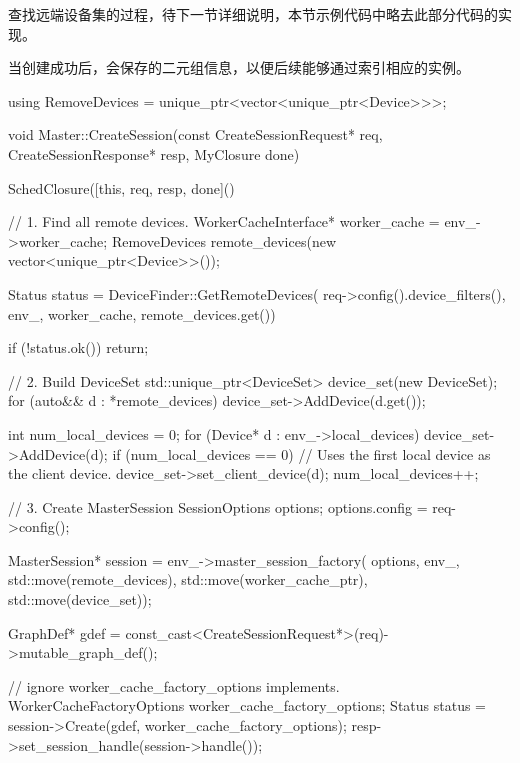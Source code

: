 \begin{content}
\begin{remark}
查找远端设备集的过程，待下一节详细说明，本节示例代码中略去此部分代码的实现。
\end{remark}

当创建成功后，会保存的二元组信息，以便后续能够通过索引相应的实例。

\begin{leftbar}
\begin{c++}
using RemoveDevices = unique_ptr<vector<unique_ptr<Device>>>;

void Master::CreateSession(const CreateSessionRequest* req,
                           CreateSessionResponse* resp, MyClosure done) {
  SchedClosure([this, req, resp, done]() {
    // 1. Find all remote devices. 
    WorkerCacheInterface* worker_cache = env_->worker_cache;
    RemoveDevices remote_devices(new vector<unique_ptr<Device>>());

    Status status = DeviceFinder::GetRemoteDevices(
        req->config().device_filters(), env_,
        worker_cache, remote_devices.get())

    if (!status.ok()) return;

    // 2. Build DeviceSet
    std::unique_ptr<DeviceSet> device_set(new DeviceSet);
    for (auto&& d : *remote_devices) {
      device_set->AddDevice(d.get());
    }

    int num_local_devices = 0;
    for (Device* d : env_->local_devices) {
      device_set->AddDevice(d);
      if (num_local_devices == 0) {
        // Uses the first local device as the client device.
        device_set->set_client_device(d);
      }
      num_local_devices++;
    }

    // 3. Create MasterSession
    SessionOptions options;
    options.config = req->config();
    
    MasterSession* session = env_->master_session_factory(
        options, env_, std::move(remote_devices), 
        std::move(worker_cache_ptr), std::move(device_set));

    GraphDef* gdef =
        const_cast<CreateSessionRequest*>(req)->mutable_graph_def();
    
    // ignore worker\_cache\_factory\_options implements.
    WorkerCacheFactoryOptions worker_cache_factory_options;
    Status status = session->Create(gdef, worker_cache_factory_options);
    resp->set_session_handle(session->handle());
    
}}
\end{c++}
\end{leftbar}
\end{content}
